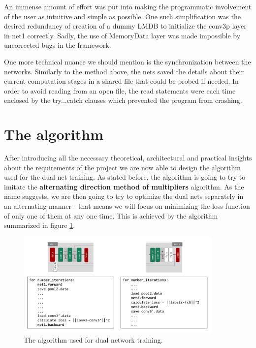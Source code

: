 \documentclass[a4paper, 12pt]{article}
\numberwithin{equation}{section}
\begin{document}
	An immense amount of effort was put into making the programmatic involvement of the user as intuitive and simple as possible. One such simplification was the desired redundancy of creation of a dummy LMDB to initialize the conv3p layer in net1 correctly. Sadly, the use of MemoryData layer was made impossible by uncorrected bugs in the framework.
	
	One more technical nuance we should mention is the synchronization between the networks. Similarly to the method above, the nets saved the details about their current computation stages in a shared file that could be probed if needed. In order to avoid reading from an open file, the read statements were each time enclosed by the try...catch clauses which prevented the program from crashing.
	
	\section{The algorithm} \label{sec:algorithm}
	
	After introducing all the necessary theoretical, architectural and practical insights about the requirements of the project we are now able to design the algorithm used for the dual net training. As stated before, the algorithm is going to try to imitate the \textbf{alternating direction method of multipliers} algorithm. As the name suggests, we are then going to try to optimize the dual nets separately in an alternating manner - that means we will focus on minimizing the loss function of only one of them at any one time. This is achieved by the algorithm summarized in figure \ref{fig:algorithm}.
	
	\begin{figure}[!h]
		\centering
		\includegraphics[page=1,width=0.9\textwidth]{algocode.pdf}
		\caption{\label{fig:algorithm}{The algorithm used for dual network training.}}
	\end{figure}
	
\end{document}
